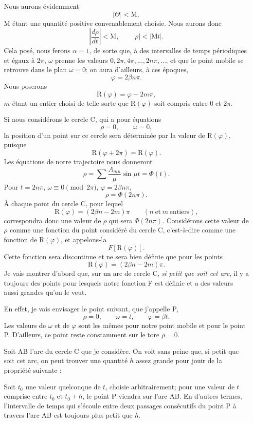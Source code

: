 \documentclass[11pt]{article}
\begin{document}
Nous aurons évidemment
\[
|\Theta|<\mathrm{M},
\]
M étant une quantité positive convenablement choisie. Nous aurons donc
\[
\left|\frac{d\rho}{dt}\right|<\mathrm{M},
\qquad
|\rho|<|\mathrm{M}t|.
\]
Cela posé, nous ferons $\alpha=1$, de sorte que, à des intervalles de temps périodiques et égaux à $2\pi$, $\omega$ prenne les valeurs $0,2\pi,4\pi,\ldots,2n\pi,\ldots$, et que le point mobile se retrouve dans le plan $\omega=0$; on aura d’ailleurs, à ces époques,
\[
\varphi=2\beta n\pi.
\]
Nous poserons
\[
\mathrm{R}(\varphi)=\varphi-2m\pi,
\]
$m$ étant un entier choisi de telle sorte que $\mathrm{R}(\varphi)$ soit compris entre 0 et $2\pi$.

Si nous considérons le cercle C, qui a pour équations
\[
\rho=0,
\qquad
\omega=0,
\]
la position d’un point sur ce cercle sera déterminée par la valeur de $\mathrm{R}(\varphi)$, puisque
\[
\mathrm{R}(\varphi+2\pi)=\mathrm{R}(\varphi).
\]
Les équations de notre trajectoire nous donneront
\[
\rho=\sum \frac{A_{mn}}{\mu}\sin\mu t=\Phi(t).
\]
Pour $t=2n\pi$, $\omega\equiv0\pmod{2\pi}$, $\varphi=2\beta n\pi$,
\[
\rho=\Phi(2n\pi).
\]
À chaque point du cercle C, pour lequel
\[
\mathrm{R}(\varphi)=(2\beta n-2m)\pi
\qquad (n\ \text{et}\ m\ \text{entiers}),
\]
correspondra donc une valeur de $\rho$ qui sera $\Phi(2n\pi)$. Considérons cette valeur de $\rho$ comme une fonction du point considéré du cercle C, c’est-à-dire comme une fonction de $\mathrm{R}(\varphi)$, et appelons-la
\[
F[\mathrm{R}(\varphi)].
\]
Cette fonction sera discontinue et ne sera bien définie que pour les points
\[
\mathrm{R}(\varphi)=(2\beta n-2m)\pi.
\]
Je vais montrer d’abord que, sur un arc de cercle C, \emph{si petit que soit cet arc}, il y a toujours des points pour lesquels notre fonction F est définie et a des valeurs aussi grandes qu’on le veut.

En effet, je vais envisager le point suivant, que j’appelle P,
\[
\rho=0,
\qquad
\omega=t,
\qquad
\varphi=\beta t.
\]
Les valeurs de $\omega$ et de $\varphi$ sont les mêmes pour notre point mobile et pour le point P. D’ailleurs, ce point reste constamment sur le tore $\rho=0$.

Soit AB l’arc du cercle C que je considère. On voit sans peine que, si petit que soit cet arc, on peut trouver une quantité $h$ assez grande pour jouir de la propriété suivante :

Soit $t_0$ une valeur quelconque de $t$, choisie arbitrairement; pour une valeur de $t$ comprise entre $t_0$ et $t_0+h$, le point P viendra sur l’arc AB. En d’autres termes, l’intervalle de temps qui s’écoule entre deux passages consécutifs du point P à travers l’arc AB est toujours plus petit que $h$.
\end{document}
